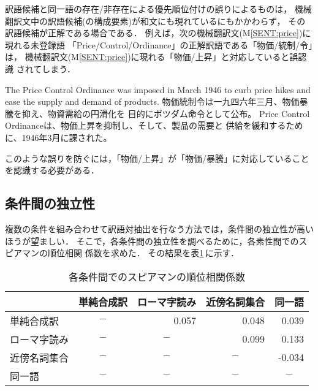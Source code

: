 訳語候補と同一語の存在/非存在による優先順位付けの誤りによるものは，
機械翻訳文中の訳語候補(の構成要素)が和文にも現れているにもかかわらず，
その訳語候補が正解である場合である．
例えば，次の機械翻訳文(M\ref{SENT:price})に現れる未登録語
「Price/Control/Ordinance」の正解訳語である「物価/統制/令」は，
機械翻訳文(M\ref{SENT:price})に現れる「物価/上昇」と対応していると誤認識
されてしまう．
\begin{SENT2}
\sentE The Price Control Ordinance was imposed in March 1946 to curb 
price hikes and ease the supply and demand of products. 
\sentH 物価統制令は一九四六年三月、物価暴騰を抑え、物資需給の円滑化を
目的にポツダム命令として公布。 
\sentM Price Control Ordinanceは、物価上昇を抑制し、そして、製品の需要と
供給を緩和するために、1946年3月に課された。 
\label{SENT:price}
\end{SENT2}
このような誤りを防ぐには，「物価/上昇」が「物価/暴騰」に対応していること
を認識する必要がある．


\subsection{条件間の独立性}
\label{sec:experiment:corel}

複数の条件を組み合わせて訳語対抽出を行なう方法では，条件間の独立性が高い
ほうが望ましい．
そこで，各条件間の独立性を調べるために，各素性間でのスピアマンの順位相関
係数\cite{Siegel83}を求めた．
その結果を表\ref{tab:corel}\,に示す．
\begin{table}[htbp]
\caption{各条件間でのスピアマンの順位相関係数}
\label{tab:corel}
\begin{center}
\begin{tabular}{|l||r|r|r|r|}\hline
& \multicolumn{1}{c|}{単純合成訳} & \multicolumn{1}{c|}{ローマ字読み} 
& \multicolumn{1}{c|}{近傍名詞集合} & \multicolumn{1}{c|}{同一語}
\\\hline\hline  
単純合成訳   & \multicolumn{1}{c|}{$-$} & 0.057 & 0.048 & 0.039 \\ 
ローマ字読み & \multicolumn{1}{c|}{$-$} & \multicolumn{1}{c|}{$-$} & 0.099 & 0.133 \\
近傍名詞集合 & \multicolumn{1}{c|}{$-$} & \multicolumn{1}{c|}{$-$} & \multicolumn{1}{c|}{$-$} & -0.034 \\
同一語       & \multicolumn{1}{c|}{$-$} & \multicolumn{1}{c|}{$-$} & \multicolumn{1}{c|}{$-$} & \multicolumn{1}{c|}{$-$} \\\hline
\end{tabular}
\end{center}
\end{table}

